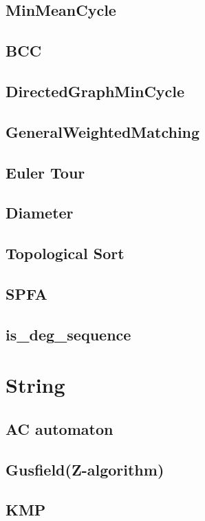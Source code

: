 \subsection{MinMeanCycle}

\subsection{BCC}
%
\subsection{DirectedGraphMinCycle}

\subsection{GeneralWeightedMatching}

\subsection{Euler Tour}
\subsection{Diameter}
\subsection{Topological Sort}
\subsection{SPFA}
\subsection{is\_deg\_sequence}



\section{String}
\subsection{AC automaton}

\subsection{Gusfield(Z-algorithm)}

\subsection{KMP}

